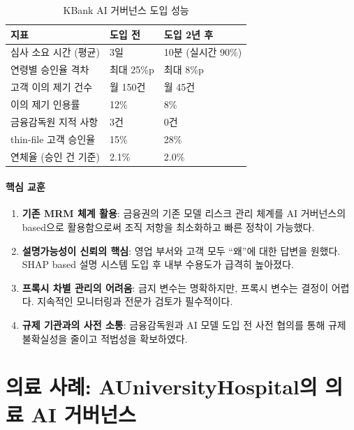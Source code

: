 \begin{table}[htbp]
\centering
\caption{KBank AI 거버넌스 도입 성능}
\label{tab:kbank_outcomes}
\begin{tabularx}{\textwidth}{p{4cm}XX}
\toprule
\textbf{지표} & \textbf{도입 전} & \textbf{도입 2년 후} \\
\midrule
심사 소요 시간 (평균) & 3일 & 10분 (실시간 90\%) \\
연령별 승인율 격차 & 최대 25\%p & 최대 8\%p \\
고객 이의 제기 건수 & 월 150건 & 월 45건 \\
이의 제기 인용률 & 12\% & 8\% \\
금융감독원 지적 사항 & 3건 & 0건 \\
thin-file 고객 승인율 & 15\% & 28\% \\
연체율 (승인 건 기준) & 2.1\% & 2.0\% \\
\bottomrule
\end{tabularx}
\end{table}

\paragraph{핵심 교훈}

\begin{enumerate}
 \item \textbf{기존 MRM 체계 활용}: 
 금융권의 기존 모델 리스크 관리 체계를 AI 거버넌스의 based으로 활용함으로써 
 조직 저항을 최소화하고 빠른 정착이 가능했다.
 
 \item \textbf{설명가능성이 신뢰의 핵심}: 
 영업 부서와 고객 모두 ``왜''에 대한 답변을 원했다. 
 SHAP based 설명 시스템 도입 후 내부 수용도가 급격히 높아졌다.
 
 \item \textbf{프록시 차별 관리의 어려움}: 
 금지 변수는 명확하지만, 프록시 변수는 결정이 어렵다. 
 지속적인 모니터링과 전문가 검토가 필수적이다.
 
 \item \textbf{규제 기관과의 사전 소통}: 
 금융감독원과 AI 모델 도입 전 사전 협의를 통해 
 규제 불확실성을 줄이고 적법성을 확보하였다.
\end{enumerate}

\section{의료 사례: AUniversityHospital의 의료 AI 거버넌스}
\label{sec:7.2}

